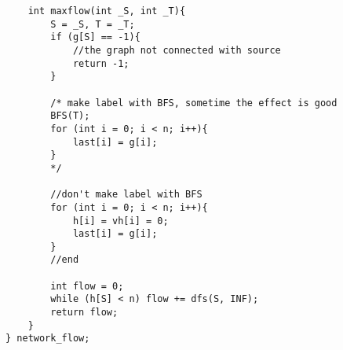 \begin{verbatim}
    int maxflow(int _S, int _T){
        S = _S, T = _T;
        if (g[S] == -1){
            //the graph not connected with source
            return -1;
        }

        /* make label with BFS, sometime the effect is good 
        BFS(T);
        for (int i = 0; i < n; i++){
            last[i] = g[i];
        }
        */
        
        //don't make label with BFS
        for (int i = 0; i < n; i++){
            h[i] = vh[i] = 0;
            last[i] = g[i];
        }
        //end

        int flow = 0;
        while (h[S] < n) flow += dfs(S, INF);
        return flow;
    }
} network_flow;
\end{verbatim} 
